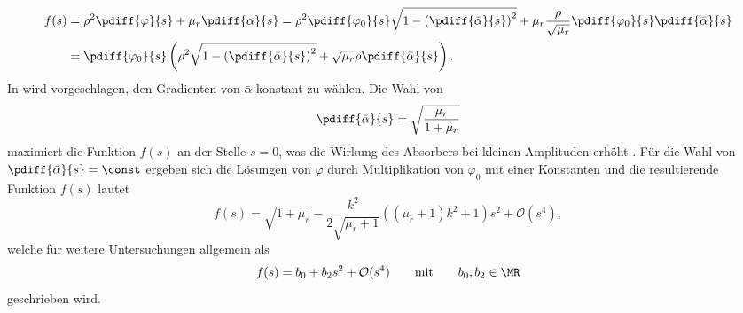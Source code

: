 %
%
%
\begin{equation}
	\begin{split}
		f(s) &= \rho^2 \pdiff{\varphi}{s} + \mu_r \pdiff{\alpha}{s}
				  = \rho^2 \pdiff{\varphi_0}{s}  \sqrt{  1 - \left(\pdiff{\bar{\alpha}}{s}\right)^2  } + \mu_r \frac{\rho}{\sqrt{\mu_r}}   \pdiff{\varphi_0}{s} \pdiff{\bar{\alpha}}{s}  \\
				 &= \pdiff{\varphi_0}{s} \left(\rho^2 \sqrt{  1 - \left(\pdiff{\bar{\alpha}}{s}\right)^2} + \sqrt{\mu_r} \rho  \pdiff{\bar{\alpha}}{s}  \right)	.
				\label{eq:AnhTautochronerAbsorberentwurfDefVonf}
	\end{split}				
\end{equation}
%
In \cite{Mayet:Tautochronic}  wird vorgeschlagen, den Gradienten von $\bar{\alpha}$ %
konstant zu wählen. 
Die Wahl von 
\begin{equation}
		 \pdiff{\bar{\alpha}}{s} = \sqrt{\frac{\mu_r}{1+\mu_r}}
				\label{eq:AnhTautochronerAbsorberentwurfWahlVonAlphaS}
\end{equation}
maximiert die Funktion $f(s)$ an der Stelle $s=0$, was die Wirkung des Absorbers bei kleinen Amplituden erhöht \cite{Mayet:Tautochronic}.
Für die Wahl von  $\pdiff{\bar{\alpha}}{s} = \const$ ergeben sich die Lösungen von $\varphi$ durch Multiplikation von $\varphi_0$
mit einer Konstanten und die resultierende Funktion $f(s)$ lautet 
%
%
%
\begin{equation}
		 f(s) = \sqrt{1+\mu_r} - \frac{k^2}{2 \sqrt{\mu_r+1}} \left(\left(\mu_r + 1\right) k^2 + 1 \right) s^2 +  \mathcal{O}(s^4),
			\label{eq:AnhTautochronerAbsorberentwurfFendgueltig}
\end{equation}
welche für weitere Untersuchungen allgemein als 
\begin{equation}
		 f(s) = b_0 + b_2 s^2 +  \mathcal{O}(s^4) \qquad \text{mit} \qquad b_0, b_2 \in \MR
			\label{eq:AnhTautochronerAbsorberentwurfFAlsPolynom}
\end{equation}
geschrieben wird.


